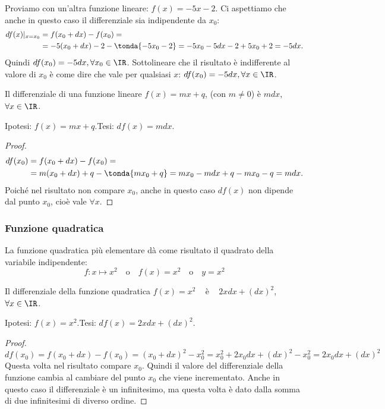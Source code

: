 \begin{esempio}
Proviamo con un'altra funzione lineare: \(f(x) = -5x-2\). 
Ci aspettiamo che anche in questo caso il differenziale sia indipendente 
da $x_0$:
\begin{align*}
df(x)|_{x=x_0} &=f(x_0+dx)-f(x_0)=\\
               &=-5(x_0+dx)-2-\tonda{-5x_0-2}=
                 -5x_0-5dx-2+5x_0+2=
                 -5dx.
\end{align*}
Quindi $df(x_0)=-5dx, \forall x_0 \in \IR$. Sottolineare che il risultato è 
indifferente al valore di $x_0$ è come dire che vale per qualsiasi $x$: 
$df(x_0)=-5dx, \forall x \in \IR$.
\end{esempio}

\begin{teorema}
 Il differenziale di una funzione lineare $f(x)=mx+q$, (con $m\ne 0$) è $mdx$, 
 $\forall x\in \IR$.
\end{teorema}

\noindent Ipotesi: \(f(x)=mx+q\).\tab Tesi: \(df(x)=mdx\).

\begin{proof}
\begin{align*}
df(x_0) &=f(x_0+dx)-f(x_0)=\\
               &=m(x_0+dx)+q-\tonda{mx_0+q}=
                 mx_0-mdx+q-mx_0-q=
                 mdx.
\end{align*}
Poiché nel risultato non compare $x_0$, anche in questo caso $df(x)$ non 
dipende dal punto $x_0$, cioè vale \(\forall x\).
\end{proof}

\subsubsection{Funzione quadratica}
\label{subsubsec:diff01_diffquad}

La funzione quadratica più elementare dà come risultato il quadrato 
della variabile indipendente:
\[f: x \mapsto x^2 \quad \text{o} \quad 
  f(x)=x^2 \quad \text{o} \quad 
  y = x^2\]

\begin{teorema}
 Il differenziale della funzione quadratica $f(x)=x^2$ ~ è ~ $2xdx+(dx)^2$, 
~$\forall x\in \IR$.
\end{teorema}

\noindent Ipotesi: \(f(x)=x^2\).\tab Tesi: \(df(x)=2xdx+(dx)^2\).

\begin{proof}
\[
 df(x_0)= 
f(x_0+dx)-f(x_0)=(x_0+dx)^2-x_0^2=x_0^2+2x_0dx+(dx)^2-x_0^2=2x_0dx+(dx)^2
\]
Questa volta nel risultato compare $x_0$. Quindi il valore del 
differenziale della funzione cambia al cambiare del punto $x_0$ che viene 
incrementato.
Anche in questo caso il differenziale è un infinitesimo, ma questa volta è 
dato dalla somma di due infinitesimi di diverso ordine.
\end{proof}

